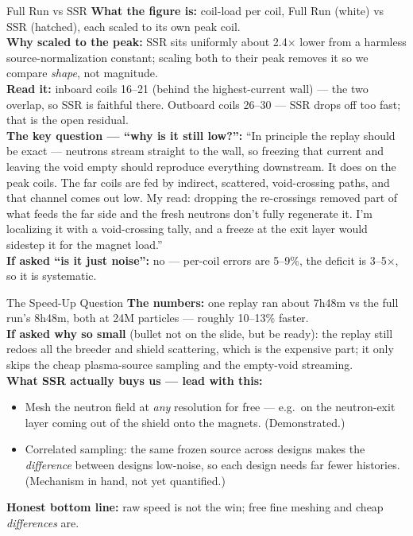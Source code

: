 \documentclass[aspectratio=169]{beamer}
\newcommand{\lab}[1]{\textcolor{acc}{\textbf{#1}}}
\begin{document}
\begin{frame}{Full Run vs SSR}
  \small
  \lab{What the figure is:} coil-load per coil, Full Run (white) vs SSR (hatched), each scaled to its own peak coil.\\[3pt]
  \lab{Why scaled to the peak:} SSR sits uniformly about 2.4$\times$ lower from a harmless source-normalization constant; scaling both to their peak removes it so we compare \emph{shape}, not magnitude.\\[3pt]
  \lab{Read it:} inboard coils 16--21 (behind the highest-current wall) --- the two overlap, so SSR is faithful there. Outboard coils 26--30 --- SSR drops off too fast; that is the open residual.\\[3pt]
  \lab{The key question --- ``why is it still low?'':} ``In principle the replay should be exact --- neutrons stream straight to the wall, so freezing that current and leaving the void empty should reproduce everything downstream. It does on the peak coils. The far coils are fed by indirect, scattered, void-crossing paths, and that channel comes out low. My read: dropping the re-crossings removed part of what feeds the far side and the fresh neutrons don't fully regenerate it. I'm localizing it with a void-crossing tally, and a freeze at the exit layer would sidestep it for the magnet load.''\\[3pt]
  \lab{If asked ``is it just noise'':} no --- per-coil errors are 5--9\%, the deficit is 3--5$\times$, so it is systematic.
\end{frame}

\begin{frame}{The Speed-Up Question}
  \small
  \lab{The numbers:} one replay ran about 7h48m vs the full run's 8h48m, both at 24M particles --- roughly 10--13\% faster.\\[3pt]
  \lab{If asked why so small} (bullet not on the slide, but be ready): the replay still redoes all the breeder and shield scattering, which is the expensive part; it only skips the cheap plasma-source sampling and the empty-void streaming.\\[3pt]
  \lab{What SSR actually buys us --- lead with this:}
  \begin{itemize}
    \item Mesh the neutron field at \emph{any} resolution for free --- e.g.\ on the neutron-exit layer coming out of the shield onto the magnets. (Demonstrated.)
    \item Correlated sampling: the same frozen source across designs makes the \emph{difference} between designs low-noise, so each design needs far fewer histories. (Mechanism in hand, not yet quantified.)
  \end{itemize}
  \lab{Honest bottom line:} raw speed is not the win; free fine meshing and cheap \emph{differences} are.
\end{frame}
\end{document}
